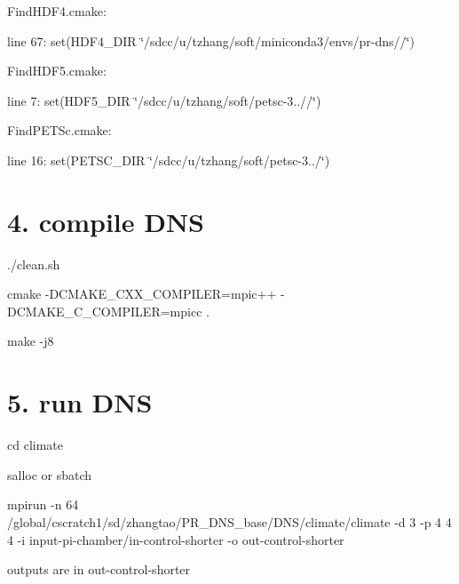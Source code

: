 \begin{DoxyItemize}
\item Find\+H\+D\+F4.\+cmake\+:
\begin{DoxyItemize}
\item line 67\+: set(H\+D\+F4\+\_\+\+D\+IR \char`\"{}/sdcc/u/tzhang/soft/miniconda3/envs/pr-\/dns//\char`\"{})
\end{DoxyItemize}
\item Find\+H\+D\+F5.\+cmake\+:
\begin{DoxyItemize}
\item line 7\+: set(H\+D\+F5\+\_\+\+D\+IR \char`\"{}/sdcc/u/tzhang/soft/petsc-\/3..//\char`\"{})
\end{DoxyItemize}
\item Find\+P\+E\+T\+Sc.\+cmake\+:
\begin{DoxyItemize}
\item line 16\+: set(P\+E\+T\+S\+C\+\_\+\+D\+IR \char`\"{}/sdcc/u/tzhang/soft/petsc-\/3../\char`\"{})
\end{DoxyItemize}
\end{DoxyItemize}

\section*{4. compile D\+NS}


\begin{DoxyItemize}
\item ./clean.sh
\item cmake -\/\+D\+C\+M\+A\+K\+E\+\_\+\+C\+X\+X\+\_\+\+C\+O\+M\+P\+I\+L\+ER=mpic++ -\/\+D\+C\+M\+A\+K\+E\+\_\+\+C\+\_\+\+C\+O\+M\+P\+I\+L\+ER=mpicc .
\item make -\/j8
\end{DoxyItemize}

\section*{5. run D\+NS}


\begin{DoxyItemize}
\item cd climate
\item salloc or sbatch
\item mpirun -\/n 64 /global/cscratch1/sd/zhangtao/\+P\+R\+\_\+\+D\+N\+S\+\_\+base/\+D\+N\+S/climate/climate -\/d 3 -\/p 4 4 4 -\/i input-\/pi-\/chamber/in-\/control-\/shorter -\/o out-\/control-\/shorter
\item outputs are in out-\/control-\/shorter 
\end{DoxyItemize}